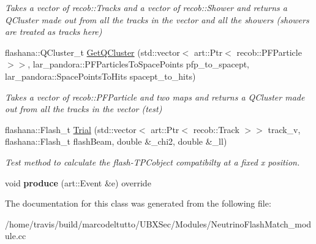 \begin{DoxyCompactItemize}
\begin{DoxyCompactList}\small\item\em Takes a vector of recob\-::\-Tracks and a vector of recob\-::\-Shower and returns a Q\-Cluster made out from all the tracks in the vector and all the showers (showers are treated as tracks here) \end{DoxyCompactList}\item 
\hypertarget{classNeutrinoFlashMatch_a93132a117b6ea907ba95bba4a6af6107}{flashana\-::\-Q\-Cluster\-\_\-t \hyperlink{classNeutrinoFlashMatch_a93132a117b6ea907ba95bba4a6af6107}{Get\-Q\-Cluster} (std\-::vector$<$ art\-::\-Ptr$<$ recob\-::\-P\-F\-Particle $>$$>$, lar\-\_\-pandora\-::\-P\-F\-Particles\-To\-Space\-Points pfp\-\_\-to\-\_\-spacept, lar\-\_\-pandora\-::\-Space\-Points\-To\-Hits spacept\-\_\-to\-\_\-hits)}\label{classNeutrinoFlashMatch_a93132a117b6ea907ba95bba4a6af6107}

\begin{DoxyCompactList}\small\item\em Takes a vector of recob\-::\-P\-F\-Particle and two maps and returns a Q\-Cluster made out from all the tracks in the vector (test) \end{DoxyCompactList}\item 
\hypertarget{classNeutrinoFlashMatch_aa957152a8c232e4b23cc7544aa6bfdd1}{flashana\-::\-Flash\-\_\-t \hyperlink{classNeutrinoFlashMatch_aa957152a8c232e4b23cc7544aa6bfdd1}{Trial} (std\-::vector$<$ art\-::\-Ptr$<$ recob\-::\-Track $>$$>$ track\-\_\-v, flashana\-::\-Flash\-\_\-t flash\-Beam, double \&\-\_\-chi2, double \&\-\_\-ll)}\label{classNeutrinoFlashMatch_aa957152a8c232e4b23cc7544aa6bfdd1}

\begin{DoxyCompactList}\small\item\em Test method to calculate the flash-\/\-T\-P\-Cobject compatibilty at a fixed x position. \end{DoxyCompactList}\item 
\hypertarget{classNeutrinoFlashMatch_a00578af5672ff925f80c1b9482c8b4ff}{void {\bfseries produce} (art\-::\-Event \&e) override}\label{classNeutrinoFlashMatch_a00578af5672ff925f80c1b9482c8b4ff}

\end{DoxyCompactItemize}


The documentation for this class was generated from the following file\-:\begin{DoxyCompactItemize}
\item 
/home/travis/build/marcodeltutto/\-U\-B\-X\-Sec/\-Modules/Neutrino\-Flash\-Match\-\_\-module.\-cc\end{DoxyCompactItemize}
